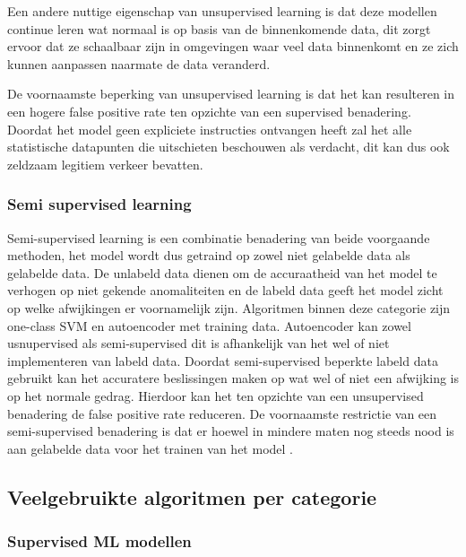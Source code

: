Een andere nuttige eigenschap van unsupervised learning is dat deze modellen continue leren wat normaal is op basis van de binnenkomende data, dit zorgt ervoor dat ze schaalbaar zijn in omgevingen waar veel data binnenkomt en ze zich kunnen aanpassen naarmate de data veranderd\autocite{Traceable2024}.

De voornaamste beperking van unsupervised learning is dat het kan resulteren in een hogere false positive rate ten opzichte van een supervised benadering. Doordat het model geen expliciete instructies ontvangen heeft zal het alle statistische datapunten die uitschieten beschouwen als verdacht, dit kan dus ook zeldzaam legitiem verkeer bevatten\autocite{Saabith2023}. 


\subsubsection{Semi supervised learning}

Semi-supervised learning is een combinatie benadering van beide voorgaande methoden, het model wordt dus getraind op zowel niet gelabelde data als gelabelde data. De unlabeld data dienen om de accuraatheid van het model te verhogen op niet gekende anomaliteiten en de labeld data geeft het model zicht op welke afwijkingen er voornamelijk zijn\autocite{Saabith2023}. 
Algoritmen binnen deze categorie zijn one-class SVM en autoencoder met training data. Autoencoder kan zowel usnupervised als semi-supervised dit is afhankelijk van het wel of niet implementeren van labeld data\autocite{Bajallan2020}. %
Doordat semi-supervised beperkte labeld data gebruikt kan het accuratere beslissingen maken op wat wel of niet een afwijking is op het normale gedrag. Hierdoor kan het ten opzichte van een unsupervised benadering de false positive rate reduceren\autocite{EmergentMind_2026}.  %
De voornaamste restrictie van een semi-supervised benadering is dat er hoewel in mindere maten nog steeds nood is aan gelabelde data voor het trainen van het model \autocite{Saabith2023}.

\subsection{Veelgebruikte algoritmen per categorie}%
\label{subsec:ml-algoritmen-overzicht}

\subsubsection{Supervised ML modellen}

